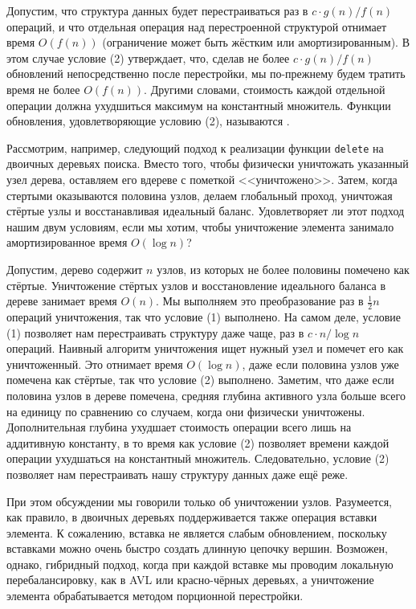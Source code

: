 Допустим, что структура данных будет перестраиваться раз в $c \cdot
g(n) / f(n)$ операций, и что отдельная операция над перестроенной
структурой отнимает время $O(f(n))$ (ограничение может быть жёстким
или амортизированным). В этом случае условие (2) утверждает, что,
сделав не более $c \cdot g(n) / f(n)$ обновлений непосредственно после
перестройки, мы по-прежнему будем тратить время не более
$O(f(n))$. Другими словами, стоимость каждой отдельной операции должна
ухудшиться максимум на константный множитель. Функции обновления,
удовлетворяющие условию (2), называются .

Рассмотрим, например, следующий подход к реализации функции
\lstinline!delete! на двоичных деревьях поиска. Вместо того, чтобы
физически уничтожать указанный узел дерева, оставляем его вдереве с
пометкой <<уничтожено>>. Затем, когда стертыми оказываются половина
узлов, делаем глобальный проход, уничтожая стёртые узлы и
восстанавливая идеальный баланс.  Удовлетворяет ли этот подход нашим
двум условиям, если мы хотим, чтобы уничтожение элемента занимало
амортизированное время $O(\log n)$?

Допустим, дерево содержит $n$ узлов, из которых не более половины
помечено как стёртые. Уничтожение стёртых узлов и восстановление
идеального баланса в дереве занимает время $O(n)$. Мы выполняем это
преобразование раз в $\frac{1}{2}n$ операций уничтожения, так что
условие (1) выполнено. На самом деле, условие (1) позволяет нам
перестраивать структуру даже чаще, раз в $c \cdot n / \log n$
операций.  Наивный алгоритм уничтожения ищет нужный узел и помечет его
как уничтоженный. Это отнимает время $O(\log n)$, даже если половина
узлов уже помечена как стёртые, так что условие (2) выполнено.
Заметим, что даже если половина узлов в дереве помечена, средняя
глубина активного узла больше всего на единицу по сравнению со
случаем, когда они физически уничтожены. Дополнительная глубина
ухудшает стоимость операции всего лишь на аддитивную константу, в то
время как условие (2) позволяет времени каждой операции ухудшаться на
константный множитель. Следовательно, условие (2) позволяет нам
перестраивать нашу структуру данных даже ещё реже.

При этом обсуждении мы говорили только об уничтожении
узлов. Разумеется, как правило, в двоичных деревьях поддерживается
также операция вставки элемента.  К сожалению, вставка не является
слабым обновлением, поскольку вставками можно очень быстро создать
длинную цепочку вершин.  Возможен, однако, гибридный подход, когда при
каждой вставке мы проводим локальную перебалансировку, как в
AVL или красно-чёрных деревьях, а уничтожение элемента обрабатывается
методом порционной перестройки.

